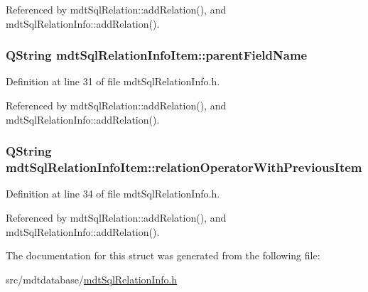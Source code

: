Referenced by mdt\-Sql\-Relation\-::add\-Relation(), and mdt\-Sql\-Relation\-Info\-::add\-Relation().

\hypertarget{structmdt_sql_relation_info_item_a2ab8ed9e084a85cc0303b7d983f5e270}{
\subsubsection[{parent\-Field\-Name}]{\setlength{\rightskip}{0pt plus 5cm}Q\-String mdt\-Sql\-Relation\-Info\-Item\-::parent\-Field\-Name}}\label{structmdt_sql_relation_info_item_a2ab8ed9e084a85cc0303b7d983f5e270}


Definition at line 31 of file mdt\-Sql\-Relation\-Info.\-h.



Referenced by mdt\-Sql\-Relation\-::add\-Relation(), and mdt\-Sql\-Relation\-Info\-::add\-Relation().

\hypertarget{structmdt_sql_relation_info_item_a30754ae8014357e546d00698d1d79d32}{
\subsubsection[{relation\-Operator\-With\-Previous\-Item}]{\setlength{\rightskip}{0pt plus 5cm}Q\-String mdt\-Sql\-Relation\-Info\-Item\-::relation\-Operator\-With\-Previous\-Item}}\label{structmdt_sql_relation_info_item_a30754ae8014357e546d00698d1d79d32}


Definition at line 34 of file mdt\-Sql\-Relation\-Info.\-h.



Referenced by mdt\-Sql\-Relation\-::add\-Relation(), and mdt\-Sql\-Relation\-Info\-::add\-Relation().



The documentation for this struct was generated from the following file\-:\begin{DoxyCompactItemize}
\item 
src/mdtdatabase/\hyperlink{mdt_sql_relation_info_8h}{mdt\-Sql\-Relation\-Info.\-h}\end{DoxyCompactItemize}
